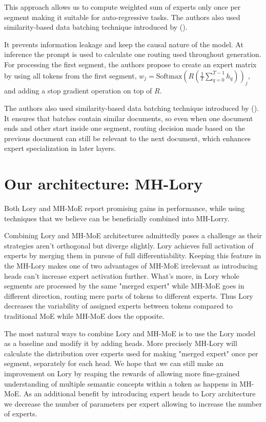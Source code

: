 \documentclass[12pt]{article}
\begin{document}
This approach allows us to compute weighted sum of experts only once per segment making it suitable for auto-regressive tasks. The authors also used similarity-based data batching technique introduced by (\cite{shi2023context}). 

It prevents information leakage and keep the causal nature of the model.
At inference the prompt is used to calculate one routing used throughout generation.
For processing the first segment, the authors propose to create an expert matrix by using all tokens from the first segment, $w_j = \text{Softmax}(R(\frac{1}{T}\sum_{q = 0}^{T-1}h_{q}))_j$, and adding a stop gradient operation on top of $R$.

The authors also used similarity-based data batching technique introduced by (\cite{shi2023context}). 
It ensures that batches contain similar documents, so even when one document ends and other start inside one segment, routing decision made based on the previous document can still be relevant to the next document, which enhances expert specialization in later layers.



\section{Our architecture: MH-Lory}
Both Lory and MH-MoE report promising gains in performance, while using techniques that we believe can be beneficially combined into MH-Lorry. 

Combining Lory and MH-MoE architectures admittedly poses a challenge as their strategies aren't orthogonal but diverge slightly. Lory achieves full activation of experts by merging them in pursue of full differentiability. Keeping this feature in the MH-Lory makes one of two advantages of MH-MoE irrelevant as introducing heads can't increase expert activation further. What's more, in Lory whole segments are processed by the same "merged expert" while MH-MoE goes in different direction, routing mere parts of tokens to different experts. Thus Lory decreases the variability of assigned experts between tokens compared to traditional MoE while MH-MoE does the opposite.

The most natural ways to combine Lory and MH-MoE is to use the Lory model as a baseline and modify it by adding heads. More precisely MH-Lory will calculate the distribution over experts used for making "merged expert" once per segment, separately for each head. We hope that we can still make an improvement on Lory by reaping the rewards of allowing more fine-grained understanding of multiple semantic concepts within a token as happens in MH-MoE. As an additional benefit by introducing expert heads to Lory architecture we decrease the number of parameters per expert allowing to increase the number of experts.
\end{document}
